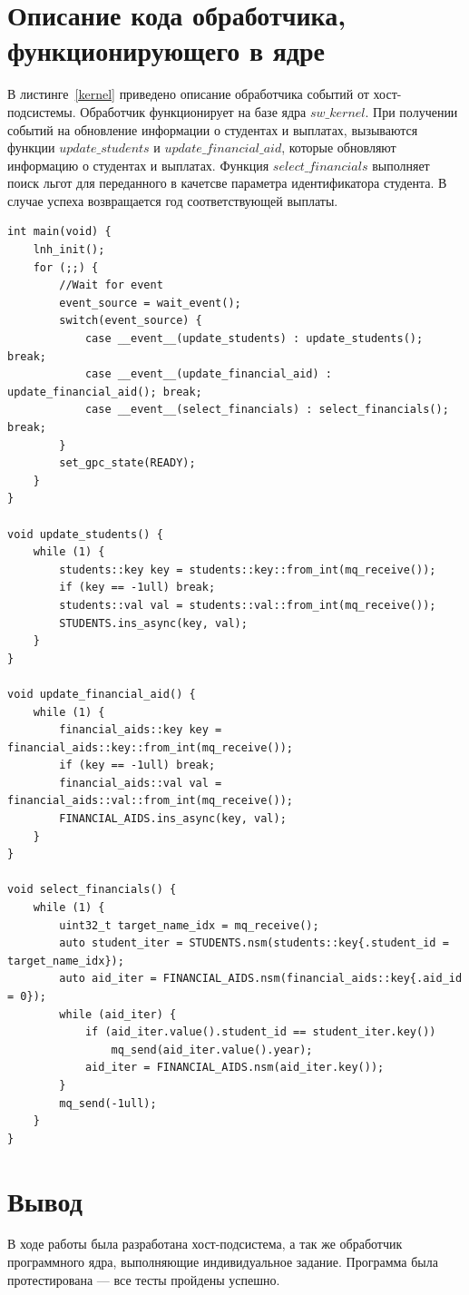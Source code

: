 \documentclass{article}
\begin{document}
\clearpage\section{Описание кода обработчика, функционирующего в ядре}

В листинге~\ref{kernel} приведено описание обработчика событий от хост-подсистемы. Обработчик функционирует на базе
ядра $sw\_kernel$. При получении событий на обновление информации о студентах и выплатах, вызываются функции 
$update\_students$ и $update\_financial\_aid$, которые обновляют информацию о студентах и выплатах. Функция 
$select\_financials$ выполняет поиск льгот для переданного в качетсве параметра идентификатора студента. В случае успеха 
возвращается год соответствующей выплаты.

\begin{lstlisting}[style=lang, label=kernel, caption=Описание кода обработчика]
int main(void) {
    lnh_init();
    for (;;) {
        //Wait for event
        event_source = wait_event();
        switch(event_source) {
            case __event__(update_students) : update_students(); break; 
            case __event__(update_financial_aid) : update_financial_aid(); break;
            case __event__(select_financials) : select_financials(); break;
        }
        set_gpc_state(READY);
    }
}

void update_students() {
    while (1) {
        students::key key = students::key::from_int(mq_receive());
        if (key == -1ull) break;
        students::val val = students::val::from_int(mq_receive());
        STUDENTS.ins_async(key, val);
    }
}

void update_financial_aid() {
    while (1) {
        financial_aids::key key = financial_aids::key::from_int(mq_receive());
        if (key == -1ull) break;
        financial_aids::val val = financial_aids::val::from_int(mq_receive());
        FINANCIAL_AIDS.ins_async(key, val);
    }
}

void select_financials() {
    while (1) {
        uint32_t target_name_idx = mq_receive();
        auto student_iter = STUDENTS.nsm(students::key{.student_id = target_name_idx});
        auto aid_iter = FINANCIAL_AIDS.nsm(financial_aids::key{.aid_id = 0});
        while (aid_iter) {
            if (aid_iter.value().student_id == student_iter.key())
                mq_send(aid_iter.value().year);
            aid_iter = FINANCIAL_AIDS.nsm(aid_iter.key());
        }    
        mq_send(-1ull);
    }
}
\end{lstlisting}

\clearpage\section{Вывод}

В ходе работы была разработана хост-подсистема, а так же обработчик программного ядра, выполняющие индивидуальное 
задание. Программа была протестирована --- все тесты пройдены успешно.
\end{document}
